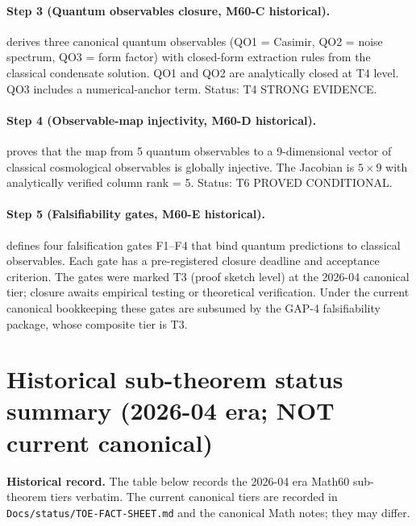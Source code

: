 \paragraph{Step 3 (Quantum observables closure, M60-C historical).}
\cite{Math60C, Math60CAddA, Math60CAddB, Math60CAddC} derives three
canonical quantum observables (QO1 = Casimir, QO2 = noise spectrum,
QO3 = form factor) with closed-form extraction rules from the classical
condensate solution. QO1 and QO2 are analytically closed at T4 level.
QO3 includes a numerical-anchor term. Status: T4 STRONG EVIDENCE.

\paragraph{Step 4 (Observable-map injectivity, M60-D historical).}
\cite{Math60D, Math60DAddB, Math60DAddC} proves that the map from
5 quantum observables to a 9-dimensional vector of classical cosmological
observables is globally injective. The Jacobian is $5 \times 9$ with
analytically verified column rank = 5. Status: T6 PROVED CONDITIONAL.

\paragraph{Step 5 (Falsifiability gates, M60-E historical).}
\cite{Math60E} defines four falsification gates F1--F4 that bind
quantum predictions to classical observables. Each gate has a
pre-registered closure deadline and acceptance criterion. The gates
were marked T3 (proof sketch level) at the 2026-04 canonical tier;
closure awaits empirical testing or theoretical verification.
Under the current canonical bookkeeping these gates are subsumed by
the GAP-4 falsifiability package, whose composite tier is T3.

\section{Historical sub-theorem status summary
(2026-04 era; NOT current canonical)}\label{sec:status-table}

\textbf{Historical record.} The table below records the
2026-04 era Math60 sub-theorem tiers verbatim. The current canonical
tiers are recorded in
\texttt{Docs/status/TOE-FACT-SHEET.md} and the canonical Math notes;
they may differ.

